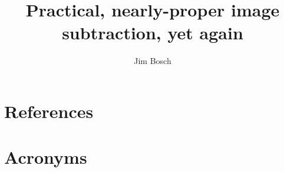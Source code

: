 \documentclass[DM,authoryear,toc]{lsstdoc}
\title{Practical, nearly-proper image subtraction, yet again}
\author{%
Jim Bosch
}
\date{\vcsDate}
\begin{document}
\maketitle


\appendix
\section{References} \label{sec:bib}
\renewcommand{\refname}{} %


\section{Acronyms} \label{sec:acronyms}

\end{document}
